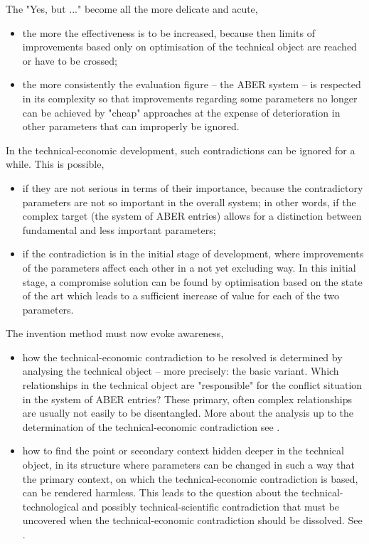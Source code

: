 \documentclass[11pt,a4paper]{article}
\begin{document}
The "Yes, but ..." become all the more delicate and acute, 
\begin{itemize}
\item the more the effectiveness is to be increased, because then limits of
  improvements based only on optimisation of the technical object are reached
  or have to be crossed;
\item the more consistently the evaluation figure -- the ABER system -- is
  respected in its complexity so that improvements regarding some parameters
  no longer can be achieved by "cheap" approaches at the expense of
  deterioration in other parameters that can improperly be ignored.
\end{itemize}

In the technical-economic development, such contradictions can be ignored for
a while. This is possible,
\begin{itemize}
\item if they are not serious in terms of their importance, because the
  contradictory parameters are not so important in the overall system; in
  other words, if the complex target (the system of ABER entries) allows for a
  distinction between fundamental and less important parameters;
\item if the contradiction is in the initial stage of development, where
  improvements of the parameters affect each other in a not yet excluding way.
  In this initial stage, a compromise solution can be found by optimisation
  based on the state of the art which leads to a sufficient increase of value
  for each of the two parameters.
\end{itemize}

The invention method must now evoke awareness,
\begin{itemize}
\item how the technical-economic contradiction to be resolved is determined by
  analysing the technical object -- more precisely: the basic variant.  Which
  relationships in the technical object are "responsible" for the conflict
  situation in the system of ABER entries?  These primary, often complex
  relationships are usually not easily to be disentangled. More about the
  analysis up to the determination of the technical-economic contradiction see
  \cite[A.1--A.4]{RM-21}.
\item how to find the point or secondary context hidden deeper in the
  technical object, in its structure where parameters can be changed in such a
  way that the primary context, on which the technical-economic contradiction
  is based, can be rendered harmless. This leads to the question about the
  technical-technological and possibly technical-scientific contradiction that
  must be uncovered when the technical-economic contradiction should be
  dissolved.  See \cite[A.5--A.9]{RM-21}.
\end{itemize}
\end{document}

